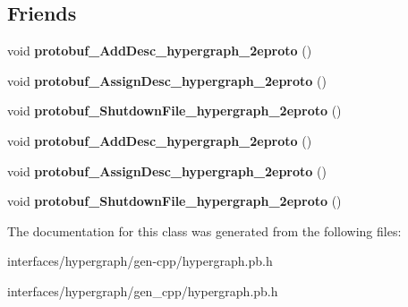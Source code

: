 \subsection*{Friends}
\begin{DoxyCompactItemize}
\item 
\hypertarget{classHypergraph_aed4781a70bb54c95ce4bb1aa4f20b05c}{
void {\bfseries protobuf\_\-AddDesc\_\-hypergraph\_\-2eproto} ()}
\label{classHypergraph_aed4781a70bb54c95ce4bb1aa4f20b05c}

\item 
\hypertarget{classHypergraph_a3cbaa41d7f7b73db437c4e7d1edcb4f3}{
void {\bfseries protobuf\_\-AssignDesc\_\-hypergraph\_\-2eproto} ()}
\label{classHypergraph_a3cbaa41d7f7b73db437c4e7d1edcb4f3}

\item 
\hypertarget{classHypergraph_a424acd7e96228bbed0dba9436582d3c1}{
void {\bfseries protobuf\_\-ShutdownFile\_\-hypergraph\_\-2eproto} ()}
\label{classHypergraph_a424acd7e96228bbed0dba9436582d3c1}

\item 
\hypertarget{classHypergraph_aed4781a70bb54c95ce4bb1aa4f20b05c}{
void {\bfseries protobuf\_\-AddDesc\_\-hypergraph\_\-2eproto} ()}
\label{classHypergraph_aed4781a70bb54c95ce4bb1aa4f20b05c}

\item 
\hypertarget{classHypergraph_a3cbaa41d7f7b73db437c4e7d1edcb4f3}{
void {\bfseries protobuf\_\-AssignDesc\_\-hypergraph\_\-2eproto} ()}
\label{classHypergraph_a3cbaa41d7f7b73db437c4e7d1edcb4f3}

\item 
\hypertarget{classHypergraph_a424acd7e96228bbed0dba9436582d3c1}{
void {\bfseries protobuf\_\-ShutdownFile\_\-hypergraph\_\-2eproto} ()}
\label{classHypergraph_a424acd7e96228bbed0dba9436582d3c1}

\end{DoxyCompactItemize}


The documentation for this class was generated from the following files:\begin{DoxyCompactItemize}
\item 
interfaces/hypergraph/gen-\/cpp/hypergraph.pb.h\item 
interfaces/hypergraph/gen\_\-cpp/hypergraph.pb.h\end{DoxyCompactItemize}
